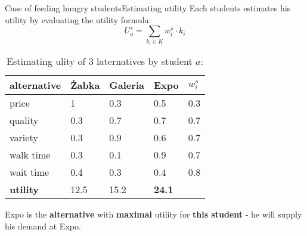 \documentclass{beamer}
\newcommand\male{\fontsize{8}{7.2}\selectfont}
\begin{document}
\begin{frame}{Case of feeding hungry students}{Estimating utility}
\male
Each students estimates his utility by evaluating the utility formula:
\begin{equation*}
U_a^s = \sum_{k_i \in K} w_i^s \cdot k_i
\end{equation*}
\begin{table}[]
\centering
\caption{\male Estimating ulity of 3 laternatives by student $a$:}
\label{my-label}
\begin{tabular}{l|lll|l}
alternative & \.{Z}abka & Galeria & Expo & $w_i^s$  \\ \hline
price & 1 & 0.3 & 0.5 & 0.3\\
quality & 0.3 & 0.7 & 0.7 & 0.7 \\
variety & 0.3 & 0.9 & 0.6 & 0.7 \\
walk time & 0.3 & 0.1 & 0.9 & 0.7 \\
wait time & 0.4 & 0.3 & 0.4 & 0.8 \\ \hline
\textbf{utility} & 12.5 & 15.2 &	\textbf{24.1} \\ \hline
\end{tabular}
\end{table}
Expo is the \textbf{alternative} with \textbf{maximal} utility for \textbf{this student} - he will supply his demand at Expo.
\end{frame}
\end{document}
